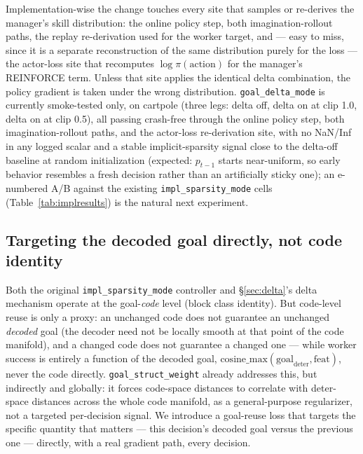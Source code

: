 \documentclass[10pt]{article}
\begin{document}
Implementation-wise the change touches every site that samples or
re-derives the manager's skill distribution: the online policy step, both
imagination-rollout paths, the replay re-derivation used for the worker
target, and --- easy to miss, since it is a separate reconstruction of the
same distribution purely for the loss --- the actor-loss site that
recomputes $\log\pi(\text{action})$ for the manager's REINFORCE term. Unless
that site applies the identical delta combination, the policy gradient is
taken under the wrong distribution. \texttt{goal\_delta\_mode} is currently
smoke-tested only, on cartpole (three legs: delta off, delta on at clip 1.0,
delta on at clip 0.5), all passing crash-free through the online policy step,
both imagination-rollout paths, and the actor-loss re-derivation site, with
no NaN/Inf in any logged scalar and a stable implicit-sparsity signal close
to the delta-off baseline at random initialization (expected: $p_{t-1}$
starts near-uniform, so early behavior resembles a fresh decision rather
than an artificially sticky one); an e-numbered A/B against the existing
\texttt{impl\_sparsity\_mode} cells (Table~\ref{tab:implresults}) is the
natural next experiment.

\subsection{Targeting the decoded goal directly, not code identity}
\label{sec:goalreuse}

Both the original \texttt{impl\_sparsity\_mode} controller and
\S\ref{sec:delta}'s delta mechanism operate at the goal-\emph{code} level
(block class identity). But code-level reuse is only a proxy: an unchanged
code does not guarantee an unchanged \emph{decoded} goal (the decoder need
not be locally smooth at that point of the code manifold), and a changed
code does not guarantee a changed one --- while worker success is entirely a
function of the decoded goal, $\mathrm{cosine\_max}(\text{goal}_{\mathrm{deter}},
\text{feat})$, never the code directly. \texttt{goal\_struct\_weight}
already addresses this, but indirectly and globally: it forces code-space
distances to correlate with deter-space distances across the whole code
manifold, as a general-purpose regularizer, not a targeted per-decision
signal. We introduce a goal-reuse loss that targets the specific quantity
that matters --- this decision's decoded goal versus the previous one ---
directly, with a real gradient path, every decision.
\end{document}
